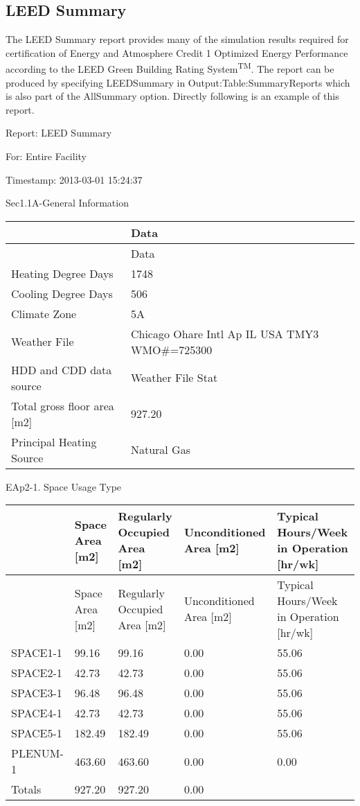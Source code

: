 \subsection{LEED Summary}\label{leed-summary}

The LEED Summary report provides many of the simulation results required for certification of Energy and Atmosphere Credit 1 Optimized Energy Performance according to the LEED Green Building Rating System\textsuperscript{TM}. The report can be produced by specifying LEEDSummary in Output:Table:SummaryReports which is also part of the AllSummary option. Directly following is an example of this report.

Report: LEED Summary

For: Entire Facility

Timestamp: 2013-03-01 15:24:37

Sec1.1A-General Information

\begin{longtable}[c]{>{\raggedright}p{2.21in}>{\raggedright}p{3.78in}}
\toprule 
 & Data \tabularnewline
\midrule
\endfirsthead

\toprule 
 & Data \tabularnewline
\midrule
\endhead

Heating Degree Days & 1748 \tabularnewline
Cooling Degree Days & 506 \tabularnewline
Climate Zone & 5A \tabularnewline
Weather File & Chicago Ohare Intl Ap IL USA TMY3 WMO\#=725300 \tabularnewline
HDD and CDD data source & Weather File Stat \tabularnewline
Total gross floor area [m2] & 927.20 \tabularnewline
Principal Heating Source & Natural Gas \tabularnewline
\bottomrule
\end{longtable}

EAp2-1. Space Usage Type

\begin{longtable}[c]{>{\raggedright}p{1.2in}>{\raggedright}p{1.2in}>{\raggedright}p{1.2in}>{\raggedright}p{1.2in}>{\raggedright}p{1.2in}}
\toprule 
 & Space Area [m2] & Regularly Occupied Area [m2] & Unconditioned Area [m2] & Typical Hours/Week in Operation [hr/wk] \tabularnewline
\midrule
\endfirsthead

\toprule 
 & Space Area [m2] & Regularly Occupied Area [m2] & Unconditioned Area [m2] & Typical Hours/Week in Operation [hr/wk] \tabularnewline
\midrule
\endhead

SPACE1-1 & 99.16 & 99.16 & 0.00 & 55.06 \tabularnewline
SPACE2-1 & 42.73 & 42.73 & 0.00 & 55.06 \tabularnewline
SPACE3-1 & 96.48 & 96.48 & 0.00 & 55.06 \tabularnewline
SPACE4-1 & 42.73 & 42.73 & 0.00 & 55.06 \tabularnewline
SPACE5-1 & 182.49 & 182.49 & 0.00 & 55.06 \tabularnewline
PLENUM-1 & 463.60 & 463.60 & 0.00 & 0.00 \tabularnewline
Totals & 927.20 & 927.20 & 0.00 & ~ \tabularnewline
\bottomrule
\end{longtable}

